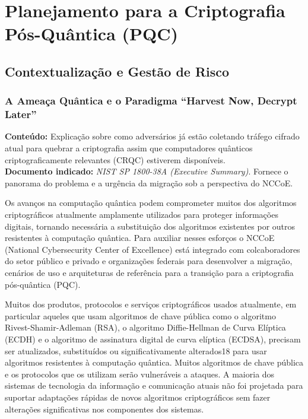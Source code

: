 \chapter{Planejamento para a Criptografia Pós-Quântica (PQC)}

\section{Contextualização e Gestão de Risco}
    \subsection{A Ameaça Quântica e o Paradigma ``Harvest Now, Decrypt Later''}
        \textbf{Conteúdo:} Explicação sobre como adversários já estão coletando tráfego cifrado atual para quebrar a criptografia assim que computadores quânticos criptograficamente relevantes (CRQC) estiverem disponíveis.\\
        \textbf{Documento indicado:} \textit{NIST SP 1800-38A (Executive Summary)}. Fornece o panorama do problema e a urgência da migração sob a perspectiva do NCCoE.

        Os avanços na computação quântica podem comprometer muitos dos algoritmos criptográficos atualmente amplamente utilizados para proteger informações digitais, tornando necessária a substituição dos algoritmos existentes por outros resistentes à computação quântica.\cite{nistSP180038A} Para auxiliar nesses esforços o NCCoE (National Cybersecurity Center of Excellence) está integrado com colcaboradores do setor público e privado e organizações federais para desenvolver a migração, cenários de uso e arquiteturas de referência para a transição para a criptografia pós-quântica (PQC).

        Muitos dos produtos, protocolos e serviços criptográficos usados atualmente, em particular aqueles que usam algoritmos de chave pública como o algoritmo Rivest-Shamir-Adleman (RSA), o algoritmo Diffie-Hellman de Curva Elíptica (ECDH) e o algoritmo de assinatura digital de curva elíptica (ECDSA), precisam ser atualizados, substituídos ou significativamente alterados18 para usar algoritmos resistentes à computação quântica. Muitos algoritmos de chave pública e os protocolos que os utilizam serão vulneráveis a ataques. A maioria dos sistemas de tecnologia da informação e comunicação atuais não foi projetada para suportar adaptações rápidas de novos algoritmos criptográficos sem fazer alterações significativas nos componentes dos sistemas.\cite{nistSP180038A}

